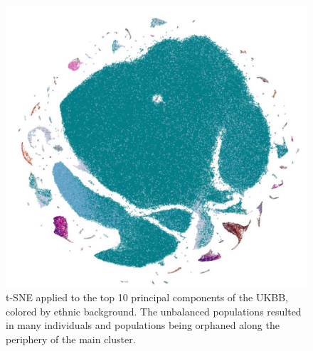 \documentclass[12pt]{pnas-new}
\begin{document}
\begin{figure}[!htb]
    \centering
    \includegraphics[width=0.95\columnwidth]{images/UKBB_TSNE_10PCs_DefaultPerplexity_eth.pdf}
    \caption{t-SNE applied to the top 10 principal components of the UKBB, colored by ethnic background. The unbalanced populations resulted in many individuals and populations being orphaned along the periphery of the main cluster.}
    \label{fig:supp_ukbb_tsne}
\end{figure}
\end{document}
